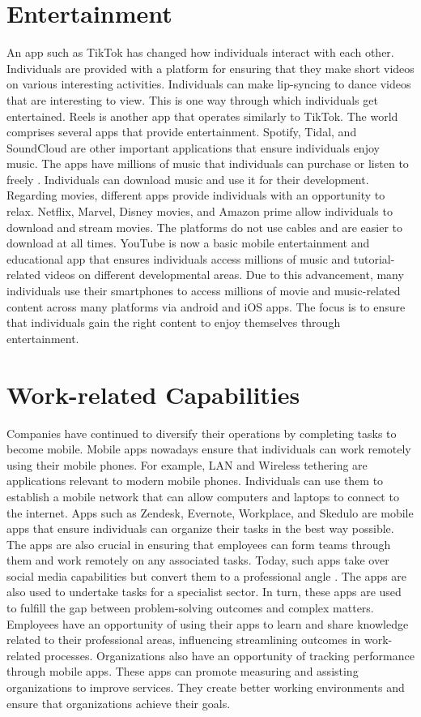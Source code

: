 \documentclass{article}
\begin{document}
\medskip

\section*{Entertainment}
An app such as TikTok has changed how individuals interact with each other. Individuals are provided with a platform for ensuring that they make short videos on various interesting activities. Individuals can make lip-syncing to dance videos that are interesting to view. This is one way through which individuals get entertained. Reels is another app that operates similarly to TikTok. The world comprises several apps that provide entertainment. Spotify, Tidal, and SoundCloud are other important applications that ensure individuals enjoy music. The apps have millions of music that individuals can purchase or listen to freely \cite{Tam20}. Individuals can download music and use it for their development. Regarding movies, different apps provide individuals with an opportunity to relax. 
Netflix, Marvel, Disney movies, and Amazon prime allow individuals to download and stream movies. The platforms do not use cables and are easier to download at all times. YouTube is now a basic mobile entertainment and educational app that ensures individuals access millions of music and tutorial-related videos on different developmental areas. Due to this advancement, many individuals use their smartphones to access millions of movie and music-related content across many platforms via android and iOS apps. The focus is to ensure that individuals gain the right content to enjoy themselves through entertainment. 

\medskip

\section*{Work-related Capabilities}

Companies have continued to diversify their operations by completing tasks to become mobile. Mobile apps nowadays ensure that individuals can work remotely using their mobile phones. For example, LAN and Wireless tethering are applications relevant to modern mobile phones. Individuals can use them to establish a mobile network that can allow computers and laptops to connect to the internet. Apps such as Zendesk, Evernote, Workplace, and Skedulo are mobile apps that ensure individuals can organize their tasks in the best way possible. 
The apps are also crucial in ensuring that employees can form teams through them and work remotely on any associated tasks. Today, such apps take over social media capabilities but convert them to a professional angle \cite{Ulas19}. The apps are also used to undertake tasks for a specialist sector. In turn, these apps are used to fulfill the gap between problem-solving outcomes and complex matters. Employees have an opportunity of using their apps to learn and share knowledge related to their professional areas, influencing streamlining outcomes in work-related processes. Organizations also have an opportunity of tracking performance through mobile apps. These apps can promote measuring and assisting organizations to improve services. They create better working environments and ensure that organizations achieve their goals.
\end{document}

